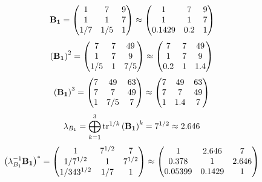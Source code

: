 \documentclass[10pt,a4paper]{article}
\begin{document}
	\[
		\bold{B_1} = 
		\begin{pmatrix}
			{1}{} & {{7}}{} & {{9}}{} \\
			{1}{} & {1}{} & {{7}}{} \\
			{1} / {{7}} & {1} / {{5}} & {1}{} \\
		\end{pmatrix}
		\approx
		\begin{pmatrix}
			1        & 7        & 9        \\
			1        & 1        & 7        \\
			0.1429   & 0.2      & 1        \\
		\end{pmatrix}
	\]
	\[
		\left(\bold{B_1}\right)^{2} = 
		\begin{pmatrix}
			{{7}}{} & {{7}}{} & {{49}}{} \\
			{1}{} & {{7}}{} & {{9}}{} \\
			{1} / {{5}} & {1}{} & {{7}} / {{5}} \\
		\end{pmatrix}
		\approx
		\begin{pmatrix}
			7        & 7        & 49       \\
			1        & 7        & 9        \\
			0.2      & 1        & 1.4      \\
		\end{pmatrix}
	\]
	\[
		\left(\bold{B_1}\right)^{3} = 
		\begin{pmatrix}
			{{7}}{} & {{49}}{} & {{63}}{} \\
			{{7}}{} & {{7}}{} & {{49}}{} \\
			{1}{} & {{7}} / {{5}} & {{7}}{} \\
		\end{pmatrix}
		\approx
		\begin{pmatrix}
			7        & 49       & 63       \\
			7        & 7        & 49       \\
			1        & 1.4      & 7        \\
		\end{pmatrix}
	\]
	\[
		\lambda_{B_1} =  \bigoplus ^{3} _{k = 1} \operatorname{tr} ^{1 / k} \left( \bold{B_1} \right)^k = {{7^ {1 / 2}}}{}\approx 2.646
	\]
	\[
		\left(\lambda_{B_1}^{-1}\bold{B_1}\right)^* = 
		\begin{pmatrix}
			{1}{} & {{7^ {1 / 2}}}{} & {{7}}{} \\
			{1} / {{7^ {1 / 2}}} & {1}{} & {{7^ {1 / 2}}}{} \\
			{1} / {{343^ {1 / 2}}} & {1} / {{7}} & {1}{} \\
		\end{pmatrix}
		\approx
		\begin{pmatrix}
			1        & 2.646    & 7        \\
			0.378    & 1        & 2.646    \\
			0.05399  & 0.1429   & 1        \\
		\end{pmatrix}
	\]
\end{document}
